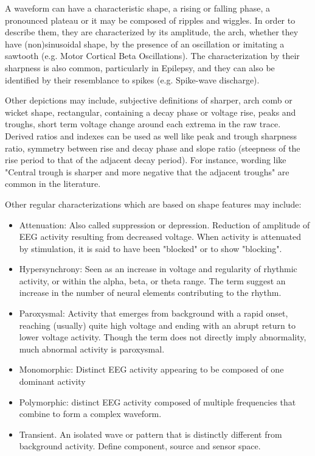 \documentclass[brainsci,article,submit,moreauthors,pdftex,10pt,a4paper]{mdpi}
\begin{document}
A waveform can have a characteristic shape, a rising or falling phase, a pronounced plateau or it may be composed of ripples and wiggles. In order to describe them, they are characterized by its amplitude, the arch, whether they have (non)sinusoidal shape, by the presence of an oscillation or imitating a sawtooth (e.g. Motor Cortical Beta Oscillations).  The characterization by their sharpness is also common, particularly in Epilepsy, and they can also be identified by their resemblance to spikes (e.g. Spike-wave discharge).

Other depictions may include, subjective definitions of sharper, arch comb or wicket shape, rectangular, containing a decay phase or voltage rise, peaks and troughs, short term voltage change around each extrema in the raw trace.  Derived ratios and indexes can be used as well like peak and trough sharpness ratio, symmetry between rise and decay phase and slope ratio (steepness of the rise period to that of the adjacent decay period).  For instance,  wording like "Central trough is sharper and more negative that the adjacent troughs" are common in the literature.

Other regular characterizations which are based on shape features may include:

\begin{itemize}
\item Attenuation: Also called suppression or depression. Reduction of amplitude of EEG activity resulting from decreased voltage. When activity is attenuated by stimulation, it is said to have been "blocked" or to show "blocking".
\item Hypersynchrony: Seen as an increase in voltage and regularity of rhythmic activity, or within the alpha, beta, or theta range. The term suggest an increase in the number of neural elements contributing to the rhythm.
\item Paroxysmal: Activity that emerges from background with a rapid onset, reaching (usually) quite high voltage and ending with an abrupt return to lower voltage activity. Though the term does not directly imply abnormality, much abnormal activity is paroxysmal.
\end{itemize}

\begin{itemize}
\item Monomorphic: Distinct EEG activity appearing to be composed of one dominant activity
\item Polymorphic: distinct EEG activity composed of multiple frequencies that combine to form a complex waveform.
\item Transient. An isolated wave or pattern that is distinctly different from background activity.  Define component, source and sensor space.
\end{itemize}
\end{document}

